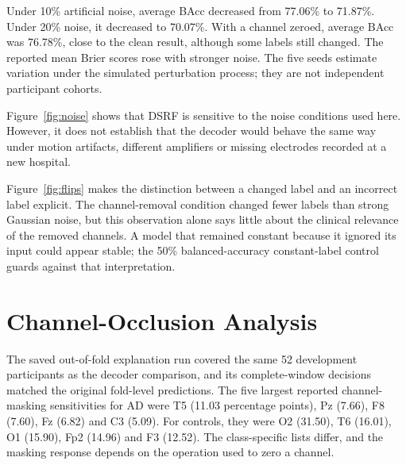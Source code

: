 Under 10\% artificial noise, average BAcc decreased from 77.06\% to 71.87\%. Under 20\% noise, it decreased to 70.07\%. With a channel zeroed, average BAcc was 76.78\%, close to the clean result, although some labels still changed. The reported mean Brier scores rose with stronger noise. The five seeds estimate variation under the simulated perturbation process; they are not independent participant cohorts.


Figure~\ref{fig:noise} shows that DSRF is sensitive to the noise conditions used here. However, it does not establish that the decoder would behave the same way under motion artifacts, different amplifiers or missing electrodes recorded at a new hospital.


Figure~\ref{fig:flips} makes the distinction between a changed label and an incorrect label explicit. The channel-removal condition changed fewer labels than strong Gaussian noise, but this observation alone says little about the clinical relevance of the removed channels. A model that remained constant because it ignored its input could appear stable; the 50\% balanced-accuracy constant-label control guards against that interpretation.

\section{Channel-Occlusion Analysis}
The saved out-of-fold explanation run covered the same 52 development participants as the decoder comparison, and its complete-window decisions matched the original fold-level predictions. The five largest reported channel-masking sensitivities for AD were T5 (11.03 percentage points), Pz (7.66), F8 (7.60), Fz (6.82) and C3 (5.09). For controls, they were O2 (31.50), T6 (16.01), O1 (15.90), Fp2 (14.96) and F3 (12.52). The class-specific lists differ, and the masking response depends on the operation used to zero a channel.

